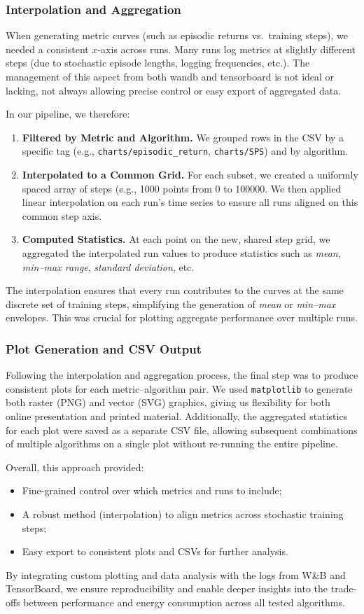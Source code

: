\subsubsection{Interpolation and Aggregation}
When generating metric curves (such as episodic returns vs.\ training steps), we needed a consistent $x$-axis across runs. Many runs log metrics at slightly different steps (due to stochastic episode lengths, logging frequencies, etc.). The management of this aspect from both wandb and tensorboard is not ideal or lacking, not always allowing precise control or easy export of aggregated data.

In our pipeline, we therefore:
\begin{enumerate}
	\item \textbf{Filtered by Metric and Algorithm.} We grouped rows in the CSV by a specific tag (e.g., \texttt{charts/episodic\_return}, \texttt{charts/SPS}) and by algorithm.
	\item \textbf{Interpolated to a Common Grid.} For each subset, we created a uniformly spaced array of steps (e.g., \num{1000} points from \num{0} to \num{100000}. We then applied linear interpolation on each run's time series to ensure all runs aligned on this common step axis.
	\item \textbf{Computed Statistics.} At each point on the new, shared step grid, we aggregated the interpolated run values to produce statistics such as \textit{mean}, \textit{min--max range}, \textit{standard deviation}, etc.
\end{enumerate}
The interpolation ensures that every run contributes to the curves at the same discrete set of training steps, simplifying the generation of \emph{mean} or \emph{min--max} envelopes. This was crucial for plotting aggregate performance over multiple runs.

\subsubsection{Plot Generation and CSV Output}
Following the interpolation and aggregation process, the final step was to produce consistent plots for each metric--algorithm pair. We used \texttt{matplotlib} to generate both raster (PNG) and vector (SVG) graphics, giving us flexibility for both online presentation and printed material. Additionally, the aggregated statistics for each plot were saved as a separate CSV file, allowing subsequent combinations of multiple algorithms on a single plot without re-running the entire pipeline.

Overall, this approach provided:
\begin{itemize}
	\item Fine-grained control over which metrics and runs to include;
	\item A robust method (interpolation) to align metrics across stochastic training steps;
	\item Easy export to consistent plots and CSVs for further analysis.
\end{itemize}
By integrating custom plotting and data analysis with the logs from W\&B and TensorBoard, we ensure reproducibility and enable deeper insights into the trade-offs between performance and energy consumption across all tested algorithms.

